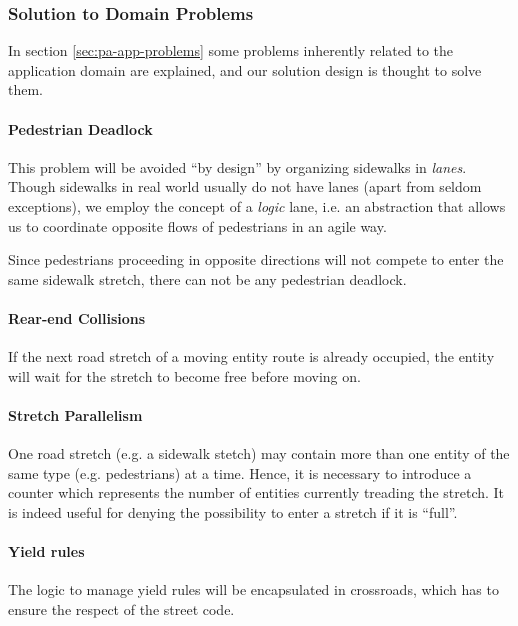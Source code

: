 \subsubsection{Solution to Domain Problems}

In section \ref{sec:pa-app-problems} some problems
inherently related to the application domain are explained,
and our solution design is thought to solve them.

\paragraph{Pedestrian Deadlock}
This problem will be avoided ``by design'' by organizing sidewalks in
\textit{lanes}. Though sidewalks in real world usually do not have lanes (apart
from seldom exceptions), we employ the concept of a \textit{logic} lane, i.e.
an abstraction that allows us to coordinate opposite flows of pedestrians in an
agile way.

Since pedestrians proceeding in opposite directions will not compete to enter
the same sidewalk stretch, there can not be any pedestrian deadlock.

\paragraph{Rear-end Collisions}
If the next road stretch of a moving entity route is already occupied,
the entity will wait for the stretch to become free before moving on.

\paragraph{Stretch Parallelism}
One road stretch (e.g. a sidewalk stetch) may contain more
than one entity of the same type (e.g. pedestrians) at a time.
Hence, it is necessary to introduce a counter which represents
the number of entities currently treading the stretch.
It is indeed useful for denying the possibility to enter a stretch if it is ``full''.

\paragraph{Yield rules}
The logic to manage yield rules will be encapsulated in crossroads,
which has to ensure the respect of the street code.
